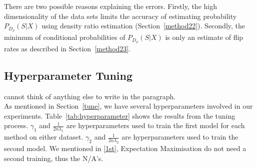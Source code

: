 \documentclass[12pt]{article} %
\begin{document}
There are two possible reasons explaining the errors. 
Firstly, the high dimensionality of the data sets limits the accuracy of estimating probability~$P_{D_\rho}(S|X)$ using density ratio estimation  (Section~\ref{method22}). 
Secondly, the minimum of conditional probabilities of $P_{D_\rho}(S|X)$ is only an estimate of flip rates as described in Section~\ref{method23}.


\subsection{Hyperparameter Tuning}
{\color{red} cannot think of anything else to write in the paragraph.}\\
As mentioned in Section~\ref{tune}, we have several hyperparameters involved in our experiments. Table~\ref{tab:hyperparameter} shows the results from the tuning process. $\gamma_1$ and $\frac{1}{2n\lambda_1}$ are hyperparameters used to train the first model for each method on either dataset. $\gamma_2$ and $\frac{1}{2n\lambda_2}$ are hyperparameters used to train the second model. We mentioned in \ref{1st}, Expectation Maximisation do not need a second training, thus the N/A's. 
\end{document}
